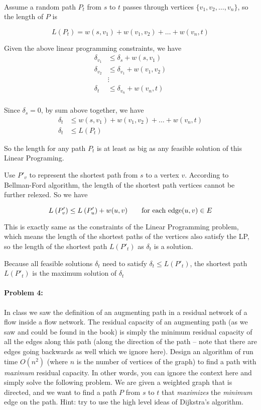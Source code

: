 \documentclass{article}
\begin{document}
\paragraph{}

Assume a random path $P_{t}$ from $s$ to $t$ passes through vertices $\{v_1, v_2, \dots, v_n\}$, so the length of $P$ is

$$L(P_{t}) = w(s, v_1) + w(v_1, v_2) + \dots + w(v_n, t)$$

Given the above linear programming constraints, we have
$$\begin{aligned}
\delta_{v_1} &\le \delta_s + w(s, v_1)\\
\delta_{v_2} &\le \delta_{v_1} + w(v_1, v_2)\\
&\vdots\\
\delta_{t} &\le \delta_{v_n} + w(v_n, t)\\
\end{aligned}$$

Since $\delta_s = 0$, by sum above together, we have
$$\begin{aligned}
\delta_{t} &\le w(s, v_1) + w(v_1, v_2) + \dots + w(v_n, t)\\
\delta_{t} &\le L(P_{t})
\end{aligned}$$

So the length for any path $P_{t}$ is at least as big as any feasible solution of this Linear Programing.

Use $P'_{v}$ to represent the shortest path from $s$ to a vertex $v$. According to Bellman-Ford algorithm, the length of the shortest path vertices cannot be further relexed. So we have

$$L\:(P'_{v}) \le L\:(P'_{u}) + w(u, v) \qquad \text{for each edge} (u, v) \in E$$

This is exactly same as the constraints of the Linear Programming problem, which means the length of the shortest paths of the vertices also satisfy the LP, so the length of the shortest path $L(P'_t)$ as $\delta_t$ is a solution.

Because all feasible solutions $\delta_t$ need to satisfy $\delta_t \le L(P'_{t})$, the shortest path $L(P'_{t})$ is the maximum solution of $\delta_t$



\newpage
\paragraph{Problem 4:}
In class we saw the definition of an augmenting path in a residual network of a flow inside a flow network. The residual capacity of an augmenting path (as we saw and could be found in the book) is simply the minimum residual capacity of all the edges along this path (along the direction of the path -- note that there are edges going backwards as well which we ignore here). Design an algorithm of run time $O(n^2)$ (where $n$ is the number of vertices of the graph) to find a path with \emph{maximum} residual capacity. In other words, you can ignore the context here and simply solve the following problem. We are given a weighted graph that is directed, and we want to find a path $P$ from $s$ to $t$ that \emph{maximizes} the \emph{minimum} edge on the path. Hint: try to use the high level ideas of Dijkstra's algorithm.
\end{document}
